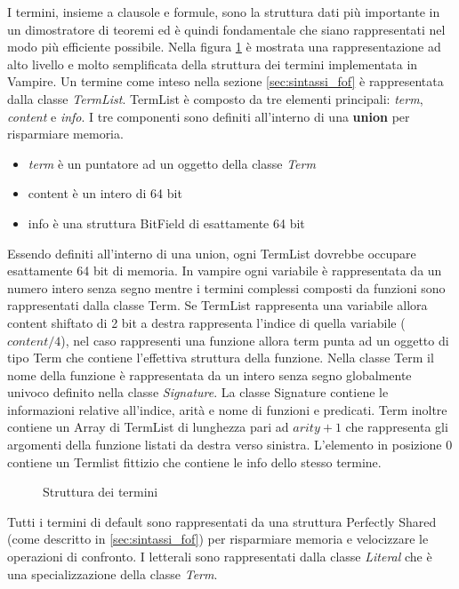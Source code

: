 \documentclass[./main.tex]{subfiles}
\begin{document}
I termini, insieme a clausole e formule, sono la struttura dati più importante in un dimostratore di teoremi ed è quindi fondamentale
che siano rappresentati nel modo più efficiente possibile. 
Nella figura \ref{fig:vampire_terms} è mostrata una rappresentazione ad alto 
livello e molto semplificata della struttura dei termini implementata in Vampire.
Un termine come inteso nella sezione \ref{sec:sintassi_fof} è rappresentata dalla classe \textit{TermList}.
TermList è composto da tre elementi principali: \textit{term}, \textit{content} e \textit{info}.
I tre componenti sono definiti all'interno di una \textbf{union} per risparmiare memoria.
\begin{itemize}
    \item \textit{term} è un puntatore ad un oggetto della classe \textit{Term}
    \item content è un intero di 64 bit
    \item info è una struttura BitField di esattamente 64 bit
\end{itemize}
Essendo definiti all'interno di una union, ogni TermList dovrebbe occupare esattamente 64 bit di memoria.
In vampire ogni variabile è rappresentata da un numero intero senza segno mentre i termini complessi
composti da funzioni sono rappresentati dalla classe Term. 
Se TermList rappresenta una variabile allora content shiftato di 2 bit a destra rappresenta l'indice di quella variabile ($content/4$),
nel caso rappresenti una funzione allora term punta ad un oggetto di tipo Term che contiene l'effettiva struttura della funzione.
Nella classe Term il nome della funzione è rappresentata da un intero senza segno globalmente univoco definito nella classe \textit{Signature}.
La classe Signature contiene le informazioni relative all'indice, arità e nome di funzioni e predicati. 
Term inoltre contiene un Array di TermList di lunghezza pari ad $arity+1$ che rappresenta gli argomenti della funzione listati 
da destra verso sinistra. L'elemento in posizione 0 contiene un Termlist fittizio che contiene le info dello stesso termine.
\begin{figure}[H]
    \centering
    \scalebox{0.55}{
        
    }
    \caption{Struttura dei termini}
    \label{fig:vampire_terms}
\end{figure}
Tutti i termini di default sono rappresentati da una struttura Perfectly Shared (come descritto in \ref{sec:sintassi_fof}) per 
risparmiare memoria e velocizzare le operazioni di confronto.
I letterali sono rappresentati dalla classe \textit{Literal} che è una specializzazione della classe \textit{Term}.
\end{document}
